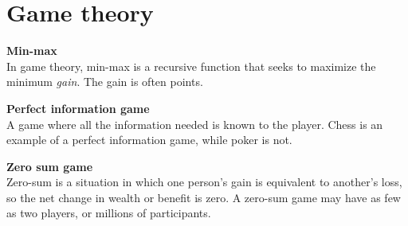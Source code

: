 \section{Game theory}

\textbf{Min-max} \\
In game theory, min-max is a recursive function that seeks to maximize the minimum \textit{gain}. The gain is often points. 

\textbf{Perfect information game} \\
A game where all the information needed is known to the player. Chess is an example of a perfect information game, while poker is not. 

\textbf{Zero sum game} \\
Zero-sum is a situation in which one person's gain is equivalent to another's loss, so the net change in wealth or benefit is zero. A zero-sum game may have as few as two players, or millions of participants.
